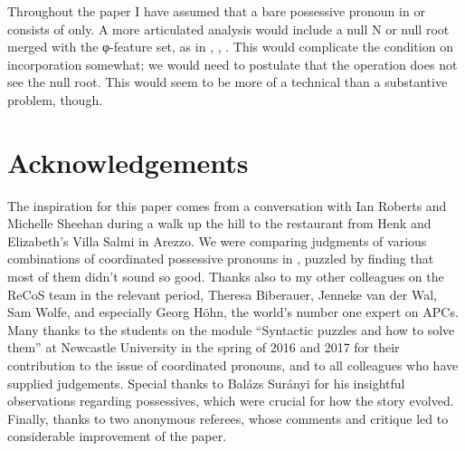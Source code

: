 \documentclass[output=paper]{langsci/langscibook}
\begin{document}
Throughout the paper I have assumed that a bare possessive pronoun in 
or  consists of  only. A more articulated analysis would
include a null N or null root merged with the φ-feature set, as in
\citet{Panagiotidis2002}, \citet{Elbourne2008}, \citet{HolmbergPhimsawat2017}.
This would complicate the condition on incorporation somewhat; we would need to
postulate that the  operation does not see the null root. This
would seem to be more of a technical than a substantive problem, though.

\printchapterglossary{}

\section*{Acknowledgements}

The inspiration for this paper comes from a conversation with Ian Roberts and
Michelle Sheehan during a walk up the hill to the restaurant from Henk and
Elizabeth's Villa Salmi in Arezzo. We were comparing judgments of various
combinations of coordinated possessive pronouns in , puzzled by finding
that most of them didn’t sound so good. Thanks also to my other colleagues on
the ReCoS team in the relevant period, Theresa Biberauer, Jenneke van der Wal,
Sam Wolfe, and especially Georg Höhn, the world's number one expert on APCs.
Many thanks to the students on the module \enquote{Syntactic puzzles and how to
    solve them} at Newcastle University in the spring of 2016 and 2017 for
    their contribution to the issue of coordinated pronouns, and to all
    colleagues who have supplied judgements. Special thanks to Balázs Surányi
    for his insightful observations regarding  possessives, which were
    crucial for how the story evolved. Finally, thanks to two anonymous
    referees, whose comments and critique led to considerable improvement of
    the paper.

{\sloppy
\printbibliography[heading=subbibliography,notkeyword=this]
}
\end{document}
